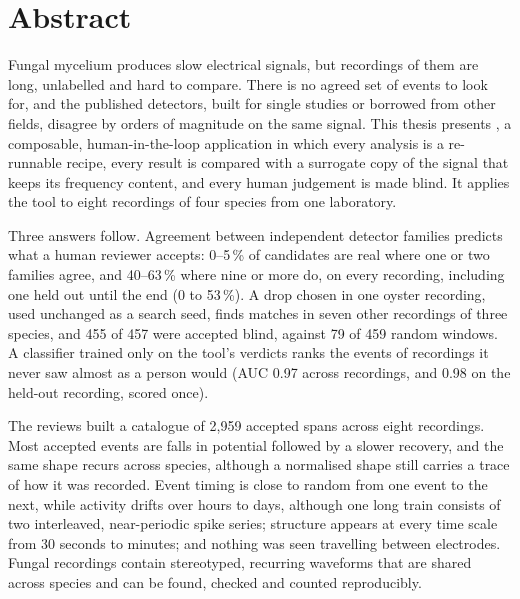 \chapter{Abstract}

Fungal mycelium produces slow electrical signals, but recordings of them are long, unlabelled and hard to compare. There is no agreed set of events to look for, and the published detectors, built for single studies or borrowed from other fields, disagree by orders of magnitude on the same signal. This thesis presents \tool{}, a composable, human-in-the-loop application in which every analysis is a re-runnable recipe, every result is compared with a surrogate copy of the signal that keeps its frequency content, and every human judgement is made blind. It applies the tool to eight recordings of four species from one laboratory.

Three answers follow. Agreement between independent detector families predicts what a human reviewer accepts: 0--5\,\% of candidates are real where one or two families agree, and 40--63\,\% where nine or more do, on every recording, including one held out until the end (0 to 53\,\%). A drop chosen in one oyster recording, used unchanged as a search seed, finds matches in seven other recordings of three species, and 455 of 457 were accepted blind, against 79 of 459 random windows. A classifier trained only on the tool's verdicts ranks the events of recordings it never saw almost as a person would (AUC 0.97 across recordings, and 0.98 on the held-out recording, scored once).

The reviews built a catalogue of 2,959 accepted spans across eight recordings. Most accepted events are falls in potential followed by a slower recovery, and the same shape recurs across species, although a normalised shape still carries a trace of how it was recorded. Event timing is close to random from one event to the next, while activity drifts over hours to days, although one long train consists of two interleaved, near-periodic spike series; structure appears at every time scale from 30 seconds to minutes; and nothing was seen travelling between electrodes. Fungal recordings contain stereotyped, recurring waveforms that are shared across species and can be found, checked and counted reproducibly.

